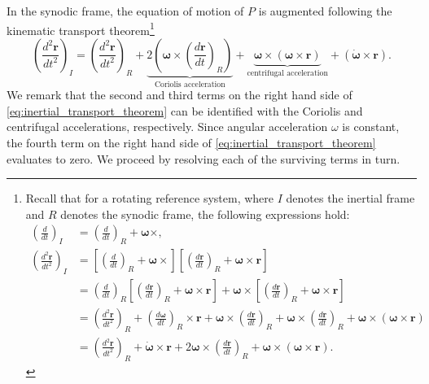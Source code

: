 In the synodic frame, the equation of motion of $P$ is augmented following the kinematic transport theorem\footnote{Recall that for a rotating reference system, where $I$ denotes the inertial frame and $R$ denotes the synodic frame, the following expressions hold:
\begin{align*}
\left(\frac{d}{dt}\right)_I &= \left(\frac{d}{dt}\right)_R + \boldsymbol{\omega}\times, \\
\left(\frac{d^2\boldsymbol{r}}{dt^2}\right)_I
&= \left[\left(\frac{d}{dt}\right)_R + \boldsymbol{\omega}\times\right]
   \left[\left(\frac{d\boldsymbol{r}}{dt}\right)_R + \boldsymbol{\omega}\times\boldsymbol{r}\right] \\
&= \left(\frac{d}{dt}\right)_R\left[\left(\frac{d\boldsymbol{r}}{dt}\right)_R + \boldsymbol{\omega}\times\boldsymbol{r}\right]
   + \boldsymbol{\omega}\times\left[\left(\frac{d\boldsymbol{r}}{dt}\right)_R + \boldsymbol{\omega}\times\boldsymbol{r}\right] \\
&= \left(\frac{d^2\boldsymbol{r}}{dt^2}\right)_R
   + \left(\frac{d\boldsymbol{\omega}}{dt}\right)_R\times\boldsymbol{r}
   + \boldsymbol{\omega}\times\left(\frac{d\boldsymbol{r}}{dt}\right)_R
   + \boldsymbol{\omega}\times\left(\frac{d\boldsymbol{r}}{dt}\right)_R
   + \boldsymbol{\omega}\times(\boldsymbol{\omega}\times\boldsymbol{r}) \\
&= \left(\frac{d^2\boldsymbol{r}}{dt^2}\right)_R
   + \dot{\boldsymbol{\omega}}\times\boldsymbol{r}
   + 2\boldsymbol{\omega}\times\left(\frac{d\boldsymbol{r}}{dt}\right)_R
   + \boldsymbol{\omega}\times(\boldsymbol{\omega}\times\boldsymbol{r}).
\end{align*}}
\begin{equation} \label{eq:inertial_transport_theorem}
    \left(\frac{d^2\boldsymbol{r}}{dt^2}\right)_I = 
    \left(\frac{d^2\boldsymbol{r}}{dt^2}\right)_R 
    + \underbrace{2\left(\boldsymbol{\omega} \times \left(\frac{d\boldsymbol{r}}{dt}\right)_R\right)}_{\text{Coriolis acceleration}} 
    + \underbrace{\boldsymbol{\omega} \times \left(\boldsymbol{\omega} \times \boldsymbol{r}\right)}_{\text{centrifugal acceleration}} 
    + \left(\dot{\boldsymbol{\omega}} \times \boldsymbol{r}\right).
\end{equation}
We remark that the second and third terms on the right hand side of \eqref{eq:inertial_transport_theorem} can be identified with the Coriolis and centrifugal accelerations, respectively. Since angular acceleration $\omega$ is constant, the fourth term on the right hand side of \eqref{eq:inertial_transport_theorem} evaluates to zero. We proceed by resolving each of the surviving terms in turn.

